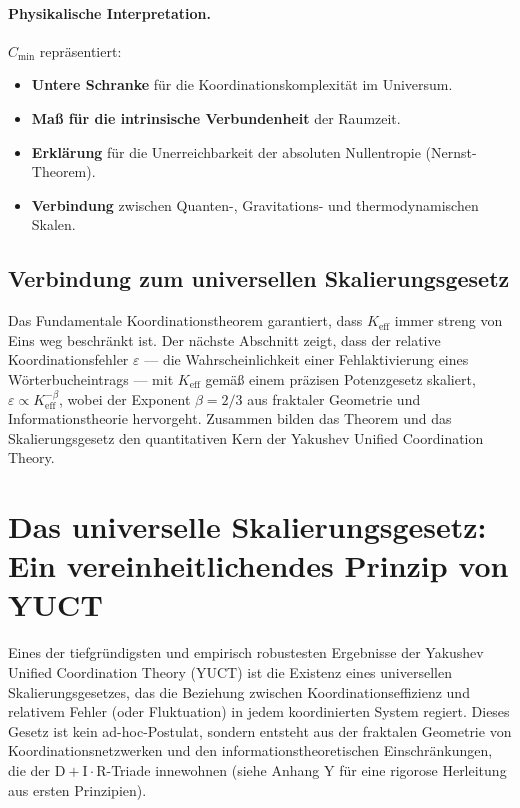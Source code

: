 \documentclass[11pt,a4paper]{article}
\begin{document}
	\paragraph{Physikalische Interpretation.}
	\(C_{\min}\) repräsentiert:
	\begin{itemize}
		\item \textbf{Untere Schranke} für die Koordinationskomplexität im Universum.
		\item \textbf{Maß für die intrinsische Verbundenheit} der Raumzeit.
		\item \textbf{Erklärung} für die Unerreichbarkeit der absoluten Nullentropie (Nernst-Theorem).
		\item \textbf{Verbindung} zwischen Quanten-, Gravitations- und thermodynamischen Skalen.
	\end{itemize}
	
	\subsection{Verbindung zum universellen Skalierungsgesetz}
	
	Das Fundamentale Koordinationstheorem garantiert, dass \(K_{\mathrm{eff}}\) immer streng von Eins weg beschränkt ist. Der nächste Abschnitt zeigt, dass der relative Koordinationsfehler \(\varepsilon\) — die Wahrscheinlichkeit einer Fehlaktivierung eines Wörterbucheintrags — mit \(K_{\mathrm{eff}}\) gemäß einem präzisen Potenzgesetz skaliert, \(\varepsilon \propto K_{\mathrm{eff}}^{-\beta}\), wobei der Exponent \(\beta = 2/3\) aus fraktaler Geometrie und Informationstheorie hervorgeht. Zusammen bilden das Theorem und das Skalierungsgesetz den quantitativen Kern der Yakushev Unified Coordination Theory.
	
	\section{Das universelle Skalierungsgesetz: Ein vereinheitlichendes Prinzip von YUCT}
	
	\label{sec:universal_scaling}
	
	Eines der tiefgründigsten und empirisch robustesten Ergebnisse der Yakushev Unified Coordination Theory (YUCT) ist die Existenz eines universellen Skalierungsgesetzes, das die Beziehung zwischen Koordinationseffizienz und relativem Fehler (oder Fluktuation) in jedem koordinierten System regiert. Dieses Gesetz ist kein ad-hoc-Postulat, sondern entsteht aus der fraktalen Geometrie von Koordinationsnetzwerken und den informationstheoretischen Einschränkungen, die der \(\mathrm{D} + \mathrm{I}\cdot \mathrm{R}\)-Triade innewohnen (siehe Anhang Y für eine rigorose Herleitung aus ersten Prinzipien).
	
\end{document}
